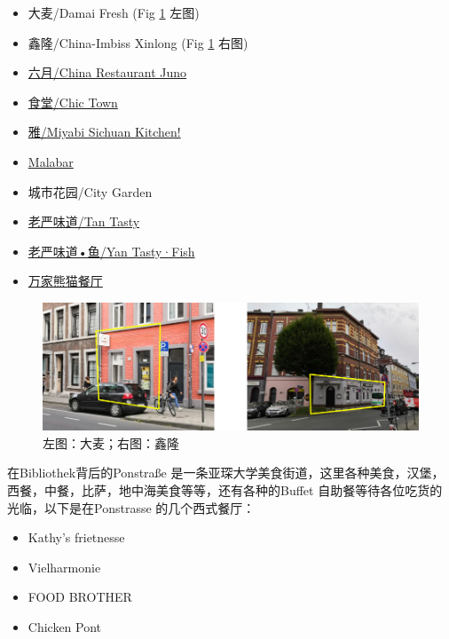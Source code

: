     \begin{itemize}
      \item 大麦/Damai Fresh (Fig \ref{fig:大麦鑫隆} 左图)
      \item 鑫隆/China-Imbiss Xinlong (Fig \ref{fig:大麦鑫隆} 右图)
      \item \href{https://chinarestaurantjuno.eatbu.com/?lang=en}{六月/China Restaurant Juno}
      \item \href{https://chic-town.business.site/}{食堂/Chic Town}
      \item \href{https://miyabi-sichuan-kitchen.business.site/}{雅/Miyabi Sichuan Kitchen!}
      \item \href{https://www.instagram.com/malabar.ac/}{Malabar}
      \item 城市花园/City Garden
      \item \href{https://yan-tasty.business.site/}{老严味道/Tan Tasty}
      \item \href{https://www.yantasty-fisch.com/}{老严味道•鱼/Yan Tasty·Fish}
      \item \href{https://homeasia.de/panda-buffet/}{万家熊猫餐厅}
    \end{itemize}

    \begin{figure}
      \centering
      \includegraphics[width=.8\textwidth]{在亚琛学习和生活/日常消费和饮食/大麦鑫隆.png}
      \caption{左图：大麦；右图：鑫隆}
      \label{fig:大麦鑫隆}
    \end{figure}

    在Bibliothek背后的Ponstraße 是一条亚琛大学美食街道，这里各种美食，汉堡，西餐，中餐，比萨，地中海美食等等，还有各种的Buffet 自助餐等待各位吃货的光临，以下是在Ponstrasse 的几个西式餐厅：

    \begin{itemize}
      \item Kathy's frietnesse
      \item Vielharmonie 
      \item FOOD BROTHER
      \item Chicken Pont
    \end{itemize}

